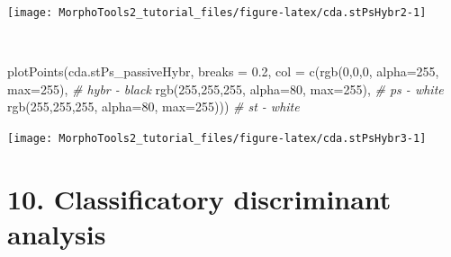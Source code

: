 \documentclass[
  11pt,
  a4paper]{article}
\newenvironment{Shaded}{\begin{snugshade}}{\end{snugshade}}
\newcommand{\AttributeTok}[1]{\textcolor[rgb]{0.77,0.63,0.00}{#1}}
\newcommand{\CommentTok}[1]{\textcolor[rgb]{0.56,0.35,0.01}{\textit{#1}}}
\newcommand{\DecValTok}[1]{\textcolor[rgb]{0.00,0.00,0.81}{#1}}
\newcommand{\FloatTok}[1]{\textcolor[rgb]{0.00,0.00,0.81}{#1}}
\newcommand{\FunctionTok}[1]{\textcolor[rgb]{0.00,0.00,0.00}{#1}}
\newcommand{\NormalTok}[1]{#1}
\begin{document}
\begin{center}\texttt{[image: MorphoTools2\_tutorial\_files/figure-latex/cda.stPsHybr2-1]} \end{center}

~\\
\hspace*{0.333em}

\begin{Shaded}
\begin{Highlighting}[]
\FunctionTok{plotPoints}\NormalTok{(cda.stPs\_passiveHybr, }\AttributeTok{breaks =} \FloatTok{0.2}\NormalTok{,}
                \AttributeTok{col =} \FunctionTok{c}\NormalTok{(}\FunctionTok{rgb}\NormalTok{(}\DecValTok{0}\NormalTok{,}\DecValTok{0}\NormalTok{,}\DecValTok{0}\NormalTok{, }\AttributeTok{alpha=}\DecValTok{255}\NormalTok{, }\AttributeTok{max=}\DecValTok{255}\NormalTok{), }\CommentTok{\# hybr {-} black}
                        \FunctionTok{rgb}\NormalTok{(}\DecValTok{255}\NormalTok{,}\DecValTok{255}\NormalTok{,}\DecValTok{255}\NormalTok{, }\AttributeTok{alpha=}\DecValTok{80}\NormalTok{, }\AttributeTok{max=}\DecValTok{255}\NormalTok{), }\CommentTok{\# ps {-} white}
                        \FunctionTok{rgb}\NormalTok{(}\DecValTok{255}\NormalTok{,}\DecValTok{255}\NormalTok{,}\DecValTok{255}\NormalTok{, }\AttributeTok{alpha=}\DecValTok{80}\NormalTok{, }\AttributeTok{max=}\DecValTok{255}\NormalTok{))) }\CommentTok{\# st {-} white }
\end{Highlighting}
\end{Shaded}

\begin{center}\texttt{[image: MorphoTools2\_tutorial\_files/figure-latex/cda.stPsHybr3-1]} \end{center}

\newpage

\hypertarget{classificatory-discriminant-analysis}{%
\section{10. Classificatory discriminant
analysis}\label{classificatory-discriminant-analysis}}
\end{document}
